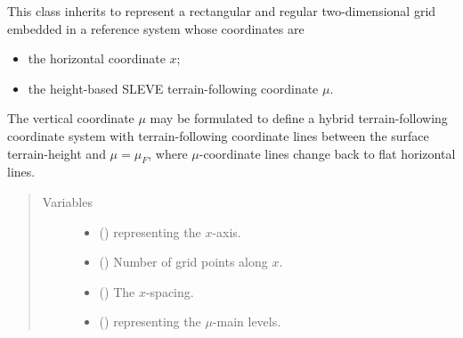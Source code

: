 \documentclass[letterpaper,10pt,english]{sphinxmanual}
\begin{document}
\begin{fulllineitems}
\label{\detokenize{api:grids.sleve.SLEVE2d}}
This class inherits {\hyperref[\detokenize{api:grids.grid_xz.GridXZ}]{}} to represent a rectangular and regular two-dimensional
grid embedded in a reference system whose coordinates are
\begin{itemize}
\item {} 
the horizontal coordinate \(x\);

\item {} 
the height-based SLEVE terrain-following coordinate \(\mu\).

\end{itemize}

The vertical coordinate \(\mu\) may be formulated to define a hybrid terrain-following coordinate system
with terrain-following coordinate lines between the surface terrain-height and \(\mu = \mu_F\), where
\(\mu\)-coordinate lines change back to flat horizontal lines.
\begin{quote}\begin{description}
\item[{Variables}] \leavevmode\begin{itemize}
\item {} 
{\hyperref[\detokenize{api:grids.grid_xyz.GridXYZ.x}]{}} () \textendash{} {\hyperref[\detokenize{api:grids.axis.Axis}]{}} representing the \(x\)-axis.

\item {} 
{\hyperref[\detokenize{api:grids.grid_xyz.GridXYZ.nx}]{}} () \textendash{} Number of grid points along \(x\).

\item {} 
{\hyperref[\detokenize{api:grids.grid_xyz.GridXYZ.dx}]{}} () \textendash{} The \(x\)-spacing.

\item {} 
 () \textendash{} {\hyperref[\detokenize{api:grids.axis.Axis}]{}} representing the \(\mu\)-main levels.


\end{itemize}
\end{description}
\end{quote}
\end{fulllineitems}
\end{document}

